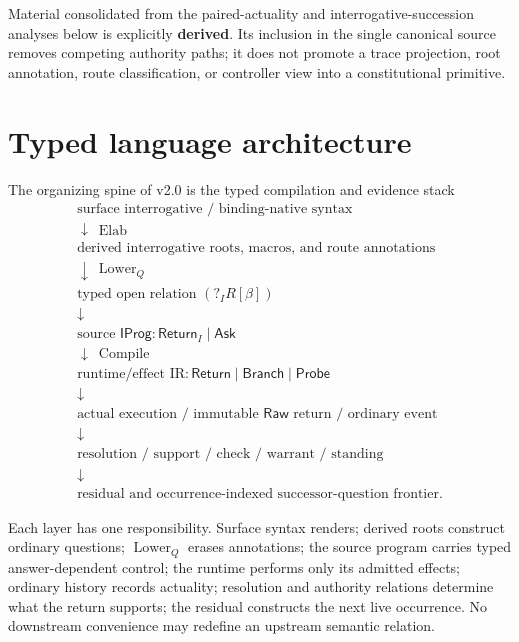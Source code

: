 \documentclass[11pt,oneside]{article}
\newcommand{\Raw}{\mathsf{Raw}}
\newcommand{\Compile}{\operatorname{Compile}}
\newcommand{\Elab}{\operatorname{Elab}}
\begin{document}
Material consolidated from the paired-actuality and interrogative-succession analyses below is
explicitly \textbf{derived}.  Its inclusion in the single canonical source removes competing
authority paths; it does not promote a trace projection, root annotation, route classification,
or controller view into a constitutional primitive.

\section{Typed language architecture}\label{sec:language-architecture}

The organizing spine of v2.0 is the typed compilation and evidence stack
\[
\boxed{
\begin{array}{c}
\text{surface interrogative / binding-native syntax}\\
\downarrow\ \Elab\\
\text{derived interrogative roots, macros, and route annotations}\\
\downarrow\ \operatorname{Lower}_Q\\
\text{typed open relation }(?_I R[\beta])\\
\downarrow\\
\text{source }\mathsf{IProg}:\mathsf{Return}_I\mid\mathsf{Ask}\\
\downarrow\ \Compile\\
\text{runtime/effect IR}:\mathsf{Return}\mid\mathsf{Branch}\mid\mathsf{Probe}\\
\downarrow\\
\text{actual execution / immutable }\Raw\text{ return / ordinary event}\\
\downarrow\\
\text{resolution / support / check / warrant / standing}\\
\downarrow\\
\text{residual and occurrence-indexed successor-question frontier}.
\end{array}
}
\]

Each layer has one responsibility.  Surface syntax renders; derived roots construct ordinary
questions; \(\operatorname{Lower}_Q\) erases annotations; the source program carries typed
answer-dependent control; the runtime performs only its admitted effects; ordinary history records
actuality; resolution and authority relations determine what the return supports; the residual
constructs the next live occurrence.  No downstream convenience may redefine an upstream semantic
relation.
\end{document}
